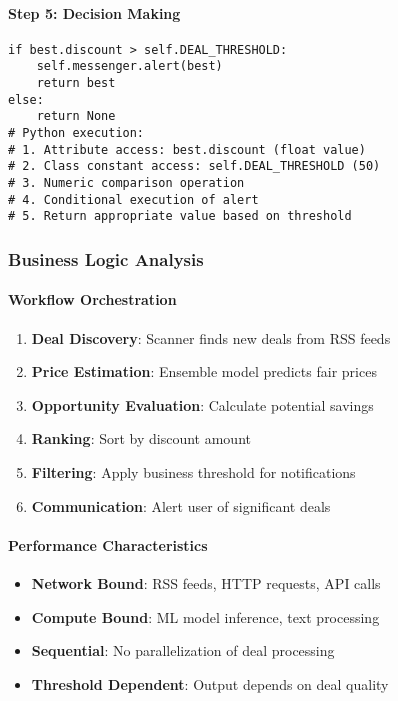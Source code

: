 \paragraph{Step 5: Decision Making}
\begin{lstlisting}[caption=Threshold Decision Logic]
if best.discount > self.DEAL_THRESHOLD:
    self.messenger.alert(best)
    return best
else:
    return None
# Python execution:
# 1. Attribute access: best.discount (float value)
# 2. Class constant access: self.DEAL_THRESHOLD (50)
# 3. Numeric comparison operation
# 4. Conditional execution of alert
# 5. Return appropriate value based on threshold
\end{lstlisting}

\subsubsection{Business Logic Analysis}

\paragraph{Workflow Orchestration}
\begin{enumerate}
\item \textbf{Deal Discovery}: Scanner finds new deals from RSS feeds
\item \textbf{Price Estimation}: Ensemble model predicts fair prices
\item \textbf{Opportunity Evaluation}: Calculate potential savings
\item \textbf{Ranking}: Sort by discount amount
\item \textbf{Filtering}: Apply business threshold for notifications
\item \textbf{Communication}: Alert user of significant deals
\end{enumerate}

\paragraph{Performance Characteristics}
\begin{itemize}
\item \textbf{Network Bound}: RSS feeds, HTTP requests, API calls
\item \textbf{Compute Bound}: ML model inference, text processing
\item \textbf{Sequential}: No parallelization of deal processing
\item \textbf{Threshold Dependent}: Output depends on deal quality
\end{itemize}

